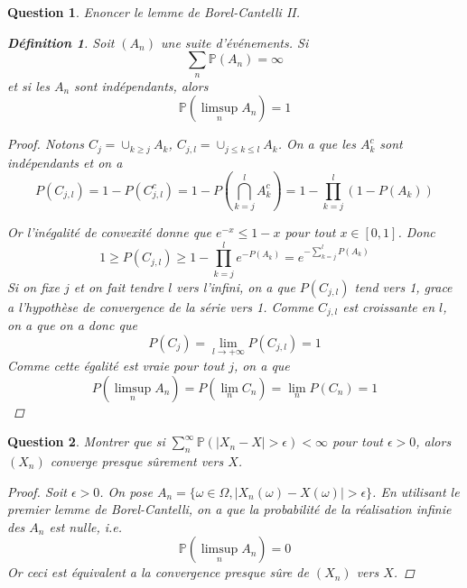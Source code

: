 \documentclass{article}
\theoremstyle{plain}
\newtheorem{question}{Question}
\theoremstyle{definition}
\newtheorem{definition}{Définition}
\begin{document}
\begin{question}
	Enoncer le lemme de Borel-Cantelli II.
	\begin{definition}
		Soit $(A_n)$ une suite d'événements. Si
		$$\sum_n \mathbb{P} (A_n) = \infty$$
		et si les $A_n$ sont indépendants, alors
		$$\mathbb{P} (\limsup_n A_n) = 1$$
		\begin{proof}
			Notons $C_j = \cup_{k \geq j} A_k$, $C_{j,l}=\cup_{j\leq k\leq l}A_k$.
			On a que les $A_k^c$ sont indépendants et on a
			\[ P(C_{j,l}) = 1 - P(C_{j,l}^c) = 1 - P\left(\bigcap_{k=j}^l A_k^c\right)
				= 1 - \prod_{k=j}^l \left( 1 - P(A_k)\right)\]

			Or l'inégalité de convexité donne que $e^{-x} \leq 1 - x$ pour tout $x \in [0, 1]$. Donc
			\[ 1 \geq P(C_{j,l}) \geq 1 - \prod_{k=j}^l e^{-P(A_k)} = e^{-\sum_{k=j}^l P(A_k)}\]
			Si on fixe $j$ et on fait tendre $l$ vers l'infini, on a que $P(C_{j,l})$ tend vers 1, grace a
			l'hypothèse de convergence de la série vers 1. Comme $C_{j,l}$ est croissante en $l$, on a que
			on a donc que
			\[ P(C_j) =  \lim_{l\to +\infty} P(C_{j,l}) = 1\]
			Comme cette égalité est vraie pour tout $j$, on a que
			\[ P(\limsup_n A_n) = P(\lim_n C_n) = \lim_n P(C_n) = 1\]
		\end{proof}
	\end{definition}
\end{question}



\begin{question}
	Montrer que si $\sum_n^{\infty} \mathbb{P} (|X_n - X| > \epsilon) < \infty$ pour tout $\epsilon > 0$, alors $(X_n)$ converge presque sûrement vers $X$.
	\begin{proof}
		Soit $\epsilon > 0$. On pose $A_n = \{\omega \in \Omega, |X_n(\omega) - X(\omega)| > \epsilon\}$. En utilisant le premier
		lemme de Borel-Cantelli, on a que la probabilité de la réalisation infinie des $A_n$ est nulle, i.e.
		\begin{equation*}
			\mathbb{P} (\limsup_n A_n) = 0
		\end{equation*}
		Or ceci est équivalent a la convergence presque sûre de $(X_n)$ vers $X$.
	\end{proof}
\end{question}
\end{document}
